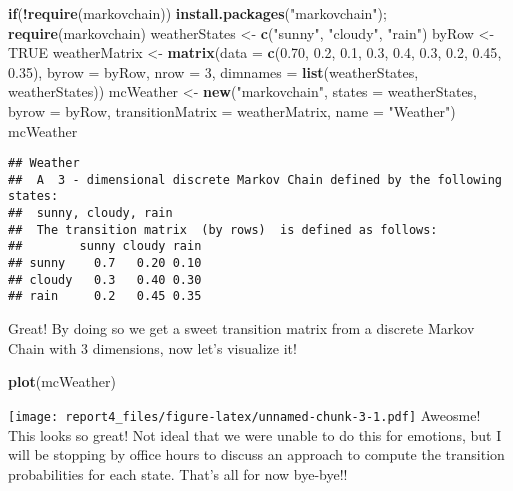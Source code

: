 \documentclass[
]{article}
\newenvironment{Shaded}{\begin{snugshade}}{\end{snugshade}}
\newcommand{\ControlFlowTok}[1]{\textcolor[rgb]{0.13,0.29,0.53}{\textbf{#1}}}
\newcommand{\DataTypeTok}[1]{\textcolor[rgb]{0.13,0.29,0.53}{#1}}
\newcommand{\DecValTok}[1]{\textcolor[rgb]{0.00,0.00,0.81}{#1}}
\newcommand{\FloatTok}[1]{\textcolor[rgb]{0.00,0.00,0.81}{#1}}
\newcommand{\KeywordTok}[1]{\textcolor[rgb]{0.13,0.29,0.53}{\textbf{#1}}}
\newcommand{\NormalTok}[1]{#1}
\newcommand{\OperatorTok}[1]{\textcolor[rgb]{0.81,0.36,0.00}{\textbf{#1}}}
\newcommand{\OtherTok}[1]{\textcolor[rgb]{0.56,0.35,0.01}{#1}}
\newcommand{\StringTok}[1]{\textcolor[rgb]{0.31,0.60,0.02}{#1}}
\begin{document}
\begin{Shaded}
\begin{Highlighting}[]
\ControlFlowTok{if}\NormalTok{(}\OperatorTok{!}\KeywordTok{require}\NormalTok{(markovchain)) }\KeywordTok{install.packages}\NormalTok{(}\StringTok{"markovchain"}\NormalTok{); }\KeywordTok{require}\NormalTok{(markovchain)}
\NormalTok{weatherStates <-}\StringTok{ }\KeywordTok{c}\NormalTok{(}\StringTok{"sunny"}\NormalTok{, }\StringTok{"cloudy"}\NormalTok{, }\StringTok{"rain"}\NormalTok{)}
\NormalTok{byRow <-}\StringTok{ }\OtherTok{TRUE}
\NormalTok{weatherMatrix <-}\StringTok{ }\KeywordTok{matrix}\NormalTok{(}\DataTypeTok{data =} \KeywordTok{c}\NormalTok{(}\FloatTok{0.70}\NormalTok{, }\FloatTok{0.2}\NormalTok{, }\FloatTok{0.1}\NormalTok{,}
                                 \FloatTok{0.3}\NormalTok{, }\FloatTok{0.4}\NormalTok{, }\FloatTok{0.3}\NormalTok{,}
                                 \FloatTok{0.2}\NormalTok{, }\FloatTok{0.45}\NormalTok{, }\FloatTok{0.35}\NormalTok{), }\DataTypeTok{byrow =}\NormalTok{ byRow, }\DataTypeTok{nrow =} \DecValTok{3}\NormalTok{, }
                                \DataTypeTok{dimnames =} \KeywordTok{list}\NormalTok{(weatherStates, weatherStates))}
\NormalTok{mcWeather <-}\StringTok{ }\KeywordTok{new}\NormalTok{(}\StringTok{"markovchain"}\NormalTok{, }\DataTypeTok{states =}\NormalTok{ weatherStates, }\DataTypeTok{byrow =}\NormalTok{ byRow,}
                  \DataTypeTok{transitionMatrix =}\NormalTok{ weatherMatrix, }\DataTypeTok{name =} \StringTok{"Weather"}\NormalTok{)}
\NormalTok{mcWeather}
\end{Highlighting}
\end{Shaded}

\begin{verbatim}
## Weather 
##  A  3 - dimensional discrete Markov Chain defined by the following states: 
##  sunny, cloudy, rain 
##  The transition matrix  (by rows)  is defined as follows: 
##        sunny cloudy rain
## sunny    0.7   0.20 0.10
## cloudy   0.3   0.40 0.30
## rain     0.2   0.45 0.35
\end{verbatim}

Great! By doing so we get a sweet transition matrix from a discrete
Markov Chain with 3 dimensions, now let's visualize it!

\begin{Shaded}
\begin{Highlighting}[]
\KeywordTok{plot}\NormalTok{(mcWeather)}
\end{Highlighting}
\end{Shaded}

\texttt{[image: report4\_files/figure-latex/unnamed-chunk-3-1.pdf]}
Aweosme! This looks so great! Not ideal that we were unable to do this
for emotions, but I will be stopping by office hours to discuss an
approach to compute the transition probabilities for each state. That's
all for now bye-bye!!
\end{document}
